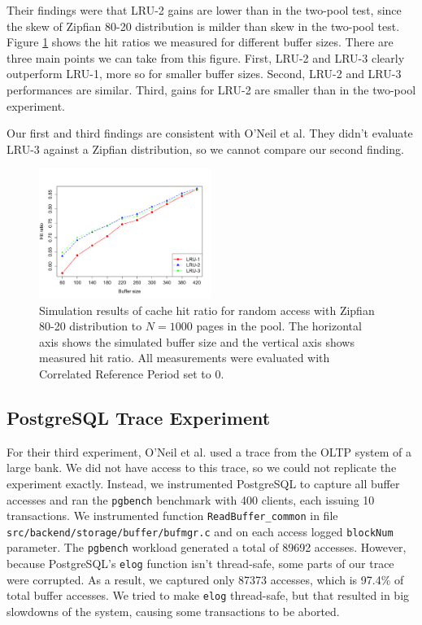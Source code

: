 Their findings were that LRU-2 gains are lower than in the two-pool test, since the skew of Zipfian 80-20 distribution is milder than skew in the two-pool test. Figure \ref{fig:zipfian} shows the hit ratios we measured for different buffer sizes. There are three main points we can take from this figure. First, LRU-2 and LRU-3 clearly outperform LRU-1, more so for smaller buffer sizes. Second, LRU-2 and LRU-3 performances are similar. Third, gains for LRU-2 are smaller than in the two-pool experiment.

Our first and third findings are consistent with O'Neil et al. They didn't evaluate LRU-3 against a Zipfian distribution, so we cannot compare our second finding.

\begin{figure}[t!]
    \centering
	\includegraphics[width=0.5\textwidth]{./figures/zipfian.pdf}
	\caption{Simulation results of cache hit ratio for random access with Zipfian 80-20 distribution to $N = 1000$ pages in the pool. The horizontal axis shows the simulated buffer size and the vertical axis shows measured hit ratio. All measurements were evaluated with Correlated Reference Period set to 0.}
	\label{fig:zipfian}
\end{figure}


\subsection{PostgreSQL Trace Experiment}

For their third experiment, O'Neil et al. \cite{lruk} used a trace from the OLTP system of a large bank. We did not have access to this trace, so we could not replicate the experiment exactly. Instead, we instrumented PostgreSQL to capture all buffer accesses and ran the \texttt{pgbench} benchmark with 400 clients, each issuing 10 transactions. We instrumented function \texttt{ReadBuffer\_common} in file \texttt{src/backend/storage/buffer/bufmgr.c} and on each access logged \texttt{blockNum} parameter. The \texttt{pgbench} workload generated a total of 89692 accesses. However, because PostgreSQL's \texttt{elog} function isn't thread-safe, some parts of our trace were corrupted. As a result, we captured only 87373 accesses, which is 97.4\% of total buffer accesses. We tried to make \texttt{elog} thread-safe, but that resulted in big slowdowns of the system, causing some transactions to be aborted. 

